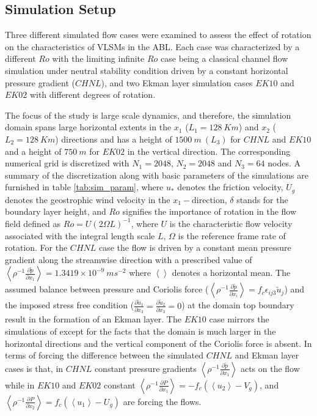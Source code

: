 \documentclass{svjour3}                     %
\begin{document}

\subsection{Simulation Setup}

Three different simulated flow cases were examined to assess the effect of rotation on the characteristics of VLSMs in the ABL. Each case was characterized by a different $Ro$ with the limiting infinite $Ro$ case  being a classical channel flow simulation under neutral stability condition driven by a constant horizontal pressure  gradient ($CHNL$), and two Ekman layer simulation cases $EK10$ and $EK02$ with different degrees of rotation. 

The focus of the study is large scale dynamics, and therefore, the simulation domain spans large horizontal extents in the $x_1$ ($L_{1}=128\ Km$) and $x_2$ ($L_{2}=128\ Km$) directions and has a height of $1500\ m\ (L_3)$ for $CHNL$ and $EK10$ and a height of $750\ m$ for $EK02$ in the vertical direction. The corresponding numerical grid is discretized with $N_{1}= 2048$, $N_{2}=2048$ and $N_{3}=64$ nodes. A summary of the discretization along with basic parameters of the simulations are furnished in table \ref{tab:sim_param}, where $u_*$ denotes the friction velocity, $U_g$ denotes the geostrophic wind velocity in the $x_1-$direction, $\delta$ stands for the boundary layer height, and  $Ro$ signifies the  importance of rotation in the flow field defined as $Ro=U(2\Omega L)^{-1}$, where $U$ is the characteristic flow velocity  associated with the integral length scale $L$, $\Omega$ is the reference frame rate of rotation. For the $CHNL$ case the flow is driven by a constant mean pressure gradient along the streamwise direction with a prescribed value of $\left < \rho^{-1} \frac{\partial \tilde{p}}{\partial x_1} \right > = 1.3419\times 10^{-9}\ ms^{-2}$ where $\left <  \right >$ denotes a horizontal mean. The assumed balance between pressure and Coriolis force ($\left < \rho^{-1}\frac{\partial \tilde{p} }{\partial x_i} \right > = f_c\epsilon_{ij3}\tilde{u}_j$) and the imposed stress free condition ($\frac{\partial \tilde{u}_1}{\partial x_3}=\frac{\partial \tilde{u}_2}{\partial x_3}=0$) at the domain top boundary result in the formation of an Ekman layer. The $EK10$ case mirrors the simulations of \citet{andren_brown_qjrm_94} except for the facts that the domain is much larger in the horizontal directions and the vertical component of the Coriolis force is absent. In terms of forcing the difference between the simulated $CHNL$ and Ekman layer cases is that, in $CHNL$ constant pressure gradients $\left < \rho^{-1} \frac{\partial \tilde{p}}{\partial x_1} \right >$   acts on the flow while in $EK10$ and $EK02$ constant $\left < \rho^{-1}\frac{\partial P }{\partial x_1} \right >  = -f_c (\left < u_2\right > - V_g)$, and $\left < \rho^{-1}\frac{\partial P }{\partial x_2} \right >  = f_c (\left < u_1\right > - U_g)$ are forcing the flows. 
\end{document}
